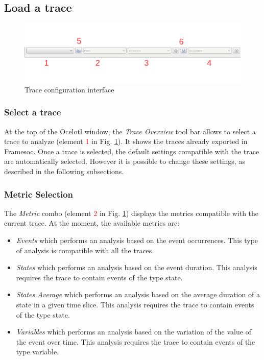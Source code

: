 \documentclass[twoside]{article}
\begin{document}
\begin{sloppypar}
\subsection{Load a trace}
\begin{figure}[h!]
	\centering
	\includegraphics[width=\textwidth]{images/traceSelection_labeled.pdf}
	\caption{Trace configuration interface}
	\label{traceConf}
\end{figure}

\subsubsection{Select a trace}

At the top of the Ocelotl window, the \textit{Trace Overview} tool bar allows to select a trace to analyze (element \textcolor{red}{1} in Fig. \ref{traceConf}). It shows the traces already exported in Framesoc. Once a trace is selected, the default settings compatible with the trace are automatically selected. However it is possible to change these settings, as described in the following subsections. 

\subsubsection{Metric Selection}
The \textit{Metric} combo (element \textcolor{red}{2} in Fig. \ref{traceConf}) displays the metrics compatible with the current trace.
At the moment, the available metrics are: 
\begin{itemize}
	\item \textit{Events} which performs an analysis based on the event occurrences. This type of analysis is compatible with all the traces.
	\item \textit{States} which performs an analysis based on the event duration. This analysis requires the trace to contain events of the type state.
	\item \textit{States Average} which performs an analysis based on the average duration of a state in a given time slice. This analysis requires the trace to contain events of the type state.
	\item \textit{Variables} which performs an analysis based on the variation of the value of the event over time. This analysis requires the trace to contain events of the type variable.
\end{itemize}


\end{sloppypar}
\end{document}
